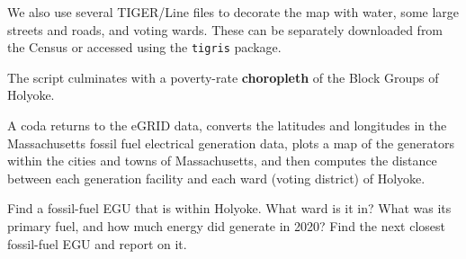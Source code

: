 \documentclass[fleqn, 12pt]{exam}
\begin{document}
\begin{questions}
  \question We also use several TIGER/Line files to decorate the map with water, some large streets and roads, and voting wards.  These can be separately downloaded from the Census or accessed using the \texttt{tigris} package.

  \question The script culminates with a poverty-rate \textbf{choropleth} of the Block Groups of Holyoke.
    
  \question A coda returns to the eGRID data, converts the latitudes and longitudes in the Massachusetts fossil fuel electrical generation data, plots a map of the generators within the cities and towns of Massachusetts, and then computes the distance between each generation facility and each ward (voting district) of Holyoke. 

  \question Find a fossil-fuel EGU that is within Holyoke.  What ward is it in? What was its primary fuel, and how much energy did generate in 2020?  Find the next closest fossil-fuel EGU and report on it.


\end{questions}
\end{document}
